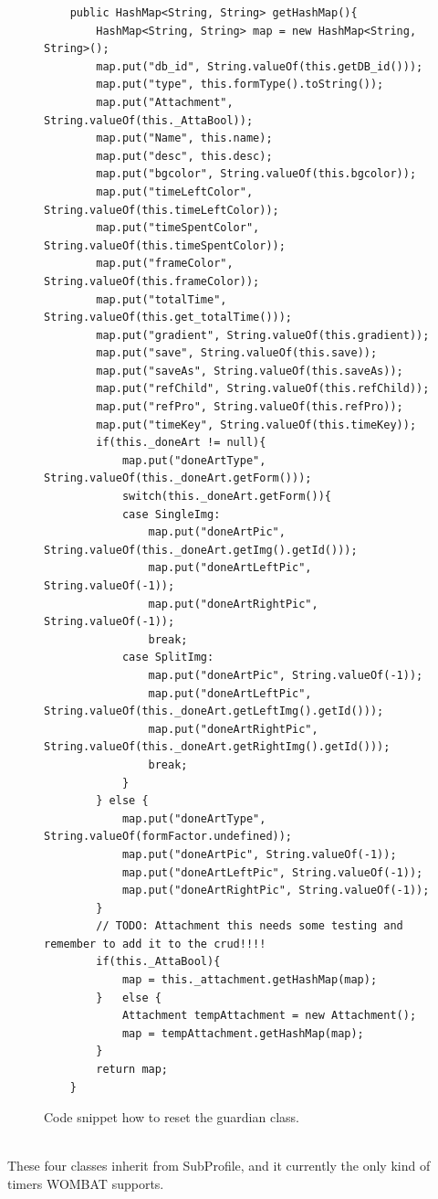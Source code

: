 \begin{description}
	\begin{figure}[H]
\begin{lstlisting}
	public HashMap<String, String> getHashMap(){
		HashMap<String, String> map = new HashMap<String, String>();
		map.put("db_id", String.valueOf(this.getDB_id()));
		map.put("type", this.formType().toString());		
		map.put("Attachment", String.valueOf(this._AttaBool));		
		map.put("Name", this.name);		
		map.put("desc", this.desc);		
		map.put("bgcolor", String.valueOf(this.bgcolor));		
		map.put("timeLeftColor", String.valueOf(this.timeLeftColor));		
		map.put("timeSpentColor", String.valueOf(this.timeSpentColor));		
		map.put("frameColor", String.valueOf(this.frameColor));
		map.put("totalTime", String.valueOf(this.get_totalTime()));		
		map.put("gradient", String.valueOf(this.gradient));		
		map.put("save", String.valueOf(this.save));		
		map.put("saveAs", String.valueOf(this.saveAs));
		map.put("refChild", String.valueOf(this.refChild));		
		map.put("refPro", String.valueOf(this.refPro));
		map.put("timeKey", String.valueOf(this.timeKey));
		if(this._doneArt != null){
			map.put("doneArtType", String.valueOf(this._doneArt.getForm()));
			switch(this._doneArt.getForm()){
			case SingleImg:
				map.put("doneArtPic", String.valueOf(this._doneArt.getImg().getId()));
				map.put("doneArtLeftPic", String.valueOf(-1));
				map.put("doneArtRightPic", String.valueOf(-1));
				break;
			case SplitImg:
				map.put("doneArtPic", String.valueOf(-1));
				map.put("doneArtLeftPic", String.valueOf(this._doneArt.getLeftImg().getId()));
				map.put("doneArtRightPic", String.valueOf(this._doneArt.getRightImg().getId()));
				break;
			}
		} else {
			map.put("doneArtType", String.valueOf(formFactor.undefined));
			map.put("doneArtPic", String.valueOf(-1));
			map.put("doneArtLeftPic", String.valueOf(-1));
			map.put("doneArtRightPic", String.valueOf(-1));
		}
		// TODO: Attachment this needs some testing and remember to add it to the crud!!!!
		if(this._AttaBool){
			map = this._attachment.getHashMap(map);				
		}	else {
			Attachment tempAttachment = new Attachment();
			map = tempAttachment.getHashMap(map);
		}
		return map;
	}
\end{lstlisting}
\caption{Code snippet how to reset the guardian class.}%
\label{code:subprofilehashmap}%
\end{figure}
	
	\item[TimeTimer - Hourglass - ProgressBar - DigitalClock] \hfill \\
  These four classes inherit from SubProfile, and it currently the only kind of timers WOMBAT supports.
 

\end{description}
